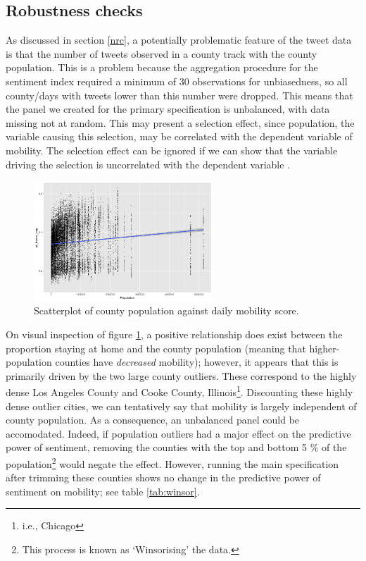 \documentclass{article}
\begin{document}
\subsection{Robustness checks}\label{robust}
As discussed in section \ref{nrc}, a potentially problematic feature of the tweet data is that the number of tweets observed in a county track with the county population. This is a problem because the aggregation procedure for the sentiment index required a minimum of 30 observations for unbiasedness, so all county/days with tweets lower than this number were dropped. This means that the panel we created for the primary specification is unbalanced, with data missing not at random. This may present a selection effect, since population, the variable causing this selection, may be correlated with the dependent variable of mobility. The selection effect can be ignored if we can show that the variable driving the selection is uncorrelated with the dependent variable \parencite[552]{wooldridgeEconometricAnalysisCross2010}. 
\begin{figure}[!htb]
  \centering
  \caption{Scatterplot of county population against daily mobility score.}
  \label{popvsmobil}
  \includegraphics[width=0.6\textwidth]{figs/popvsmobil.png}
\end{figure}
On visual inspection of figure \ref{popvsmobil}, a positive relationship does exist between the proportion staying at home and the county population (meaning that higher-population counties have \textit{decreased} mobility); however, it appears that this is primarily driven by the two large county outliers. These correspond to the highly dense Los Angeles County and Cooke County, Illinois\footnote{i.e., Chicago}. Discounting these highly dense outlier cities, we can tentatively say that mobility is largely independent of county population. As a consequence, an unbalanced panel could be accomodated. Indeed, if population outliers had a major effect on the predictive power of sentiment, removing the counties with the top and bottom 5 \% of the population\footnote{This process is known as `Winsorising' the data.} would negate the effect. However, running the main specification after trimming these counties shows no change in the predictive power of sentiment on mobility; see table \ref{tab:winsor}.
\end{document}
